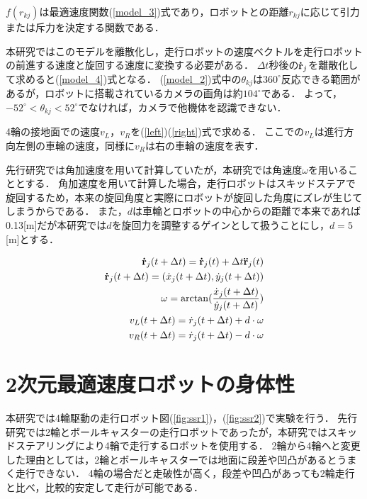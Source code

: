 \documentclass[twocolumn,dvipdfmx]{jarticle}
\begin{document}
$f(r_{kj})$は最適速度関数(\ref{model_3})式であり，ロボットとの距離$r_{kj}$に応じて引力または斥力を決定する関数である．

本研究ではこのモデルを離散化し，走行ロボットの速度ベクトルを走行ロボットの前進する速度と旋回する速度に変換する必要がある．
$\Delta t$秒後の${\bf \dot{r}}_j$を離散化して求めると(\ref{model_4})式となる．
(\ref{model_2})式中の$\theta_{kj}$は$360^{\circ}$反応できる範囲があるが，ロボットに搭載されているカメラの画角は約$104^{\circ}$である．
よって，$ -52^{\circ}< \theta_{kj} < 52^{\circ}$でなければ，カメラで他機体を認識できない．

4輪の接地面での速度$v_L$，$v_R$を(\ref{left})(\ref{right})式で求める．
ここでの$v_L$は進行方向左側の車輪の速度，同様に$v_R$は右の車輪の速度を表す．

先行研究\cite{mygm}では角加速度を用いて計算していたが，本研究では角速度$\omega$を用いることとする．
角加速度を用いて計算した場合，走行ロボットはスキッドステアで旋回するため，本来の旋回角度と実際にロボットが旋回した角度にズレが生じてしまうからである．
また，$d$は車輪とロボットの中心からの距離で本来であれば0.13[m]だが本研究では$d$を旋回力を調整するゲインとして扱うことにし，$d=5$[m]とする．

\vspace{-2.5mm}
\begin{eqnarray}
\label{model_4}
{\bf \dot{r}}_j(t+\Delta t) = {\bf \dot{r}}_j(t) + \Delta t {\bf \ddot{r}}_j (t) \\
\label{model_6}
{\bf \dot{r}}_j(t+\Delta t) = (\dot{x}_{j}(t+\Delta t) , \dot{y}_{j}(t+\Delta t))\\
\label{model_omega}
\omega = \arctan(\frac{\dot{x}_{j}(t+\Delta t)}{\dot{y}_{j}(t+\Delta t)}) \\
\label{left}
v_L(t + \Delta t) = \dot{r}_j(t + \Delta t) + d \cdot \omega\\
\label{right}
v_R(t + \Delta t) = \dot{r}_j(t + \Delta t) - d \cdot \omega
\end{eqnarray}
\section{2次元最適速度ロボットの身体性}
本研究では4輪駆動の走行ロボット図(\ref{fig:ssr1})，(\ref{fig:ssr2})で実験を行う．
先行研究\cite{mygm}では2輪とボールキャスターの走行ロボットであったが，本研究ではスキッドステアリングにより4輪で走行するロボットを使用する．
2輪から4輪へと変更した理由としては，2輪とボールキャスターでは地面に段差や凹凸があるとうまく走行できない．
4輪の場合だと走破性が高く，段差や凹凸があっても2輪走行と比べ，比較的安定して走行が可能である．
\end{document}
